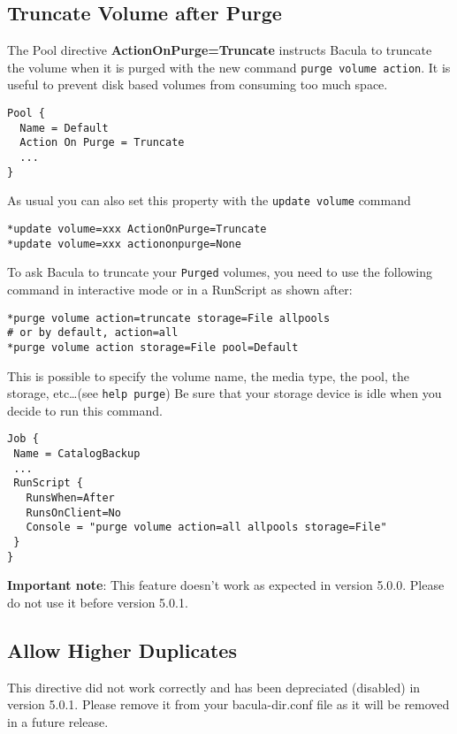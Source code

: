 \subsection{Truncate Volume after Purge}
\label{sec:actiononpurge}

The Pool directive \textbf{ActionOnPurge=Truncate} instructs Bacula to truncate
the volume when it is purged with the new command \texttt{purge volume
  action}. It is useful to prevent disk based volumes from consuming too much
space.

\begin{verbatim}
Pool {
  Name = Default
  Action On Purge = Truncate
  ...
}
\end{verbatim}

As usual you can also set this property with the \texttt{update volume} command
\begin{verbatim}
*update volume=xxx ActionOnPurge=Truncate
*update volume=xxx actiononpurge=None
\end{verbatim}

To ask Bacula to truncate your \texttt{Purged} volumes, you need to use the
following command in interactive mode or in a RunScript as shown after:
\begin{verbatim}
*purge volume action=truncate storage=File allpools
# or by default, action=all
*purge volume action storage=File pool=Default
\end{verbatim}

This is possible to specify the volume name, the media type, the pool, the
storage, etc\dots (see \texttt{help purge}) Be sure that your storage device is
idle when you decide to run this command.

\begin{verbatim}
Job {
 Name = CatalogBackup
 ...
 RunScript {
   RunsWhen=After
   RunsOnClient=No
   Console = "purge volume action=all allpools storage=File"
 }
}
\end{verbatim}

\textbf{Important note}: This feature doesn't work as
expected in version 5.0.0. Please do not use it before version 5.0.1.

\subsection{Allow Higher Duplicates}
This directive did not work correctly and has been depreciated
(disabled) in version 5.0.1. Please remove it from your bacula-dir.conf
file as it will be removed in a future release.

